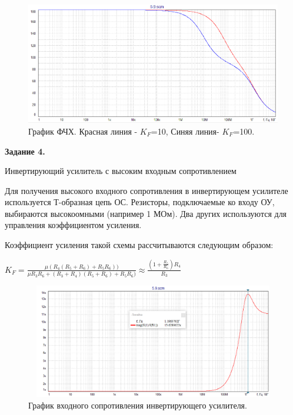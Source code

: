 \documentclass[a4paper,14pt]{extarticle}
\begin{document}
    \begin{figure}
        \begin{center}
            \includegraphics[scale=0.6]{8.png}
        \end{center}
        \caption{График ФЧХ. Красная линия - $K_F$=10, Синяя линия- $K_F$=100.}
    \end{figure}

    \begin{center}
        \textbf{Задание 4.}
    \end{center}
    Инвертирующий усилитель с высоким входным сопротивлением
    
    Для получения высокого входного сопротивления в инвертирующем 
    усилителе используется Т-образная цепь ОС. Резисторы, подключаемые ко
    входу ОУ, выбираются высокоомными (например 1 МОм). Два других
    используются для управления коэффициентом усиления.

    Коэффициент усиления такой схемы рассчитываются следующим образом:

    \begin{center}
        $K_F=\frac{\mu(R_4(R_5+R_6)+R_5R_6))}{\mu R_3R_6+(R_3+R_4)(R_5+R_6)+R_5R_6)}\approx \frac{(1+\frac{R_5}{R_6})R_4}{R_3}$
    \end{center}
    \begin{figure}[h!]
        \begin{center}
            \includegraphics[width=15cm,height=5cm]{10.png}
        \end{center}
        \caption{График входного сопротивления инвертирующего усилителя.}
    \end{figure}
\end{document}
